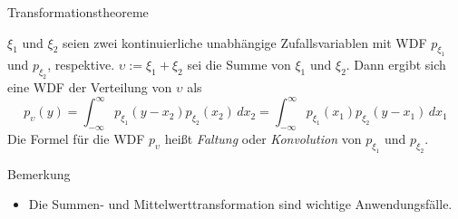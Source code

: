 \documentclass[
  8pt,
  ignorenonframetext,
]{beamer}
\providecommand{\tightlist}{%
  \setlength{\itemsep}{0pt}\setlength{\parskip}{0pt}}
\newcommand{\ups}{\upsilon}
\begin{document}
\begin{frame}{Transformationstheoreme}
\protect\hypertarget{transformationstheoreme-7}{}
\small
\begin{theorem}
\justifying
\normalfont
$\xi_1$ und $\xi_2$ seien zwei kontinuierliche unabhängige Zufallsvariablen mit WDF
$p_{\xi_1}$ und $p_{\xi_2}$, respektive. $\ups := \xi_1 + \xi_2$ sei die Summe von $\xi_1$
und $\xi_2$. Dann ergibt sich eine WDF der Verteilung von $\ups$ als
\begin{equation}
p_\ups(y)
= \int_{-\infty}^\infty p_{\xi_1}(y - x_2)p_{\xi_2}(x_2)\,dx_2
= \int_{-\infty}^\infty p_{\xi_1}(x_1)p_{\xi_2}(y - x_1)\,dx_1
\end{equation}
Die Formel für die WDF $p_\ups$ heißt \textit{Faltung} oder \textit{Konvolution}
von $p_{\xi_1}$ und $p_{\xi_2}$.
\end{theorem}

\footnotesize

Bemerkung

\begin{itemize}
\tightlist
\item
  Die Summen- und Mittelwerttransformation sind wichtige
  Anwendungsfälle.
\end{itemize}
\end{frame}
\end{document}

